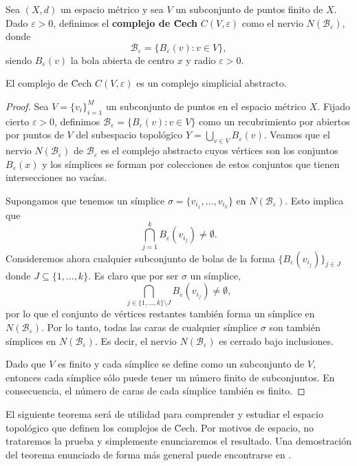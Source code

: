 \begin{definicion}
	Sea $(X,d)$ un espacio métrico y sea $V$ un subconjunto de puntos finito de $X$.
	Dado $\varepsilon > 0$, definimos el \textbf{complejo de \u Cech}
	$C(V, \varepsilon)$ como el nervio $N(\mathcal{B}_{\varepsilon})$, donde
	\[
	\mathcal{B}_{\varepsilon} = \{ B_{\varepsilon}(v) : v \in V \},
	\]
	siendo $B_{\varepsilon}(v)$ la bola abierta de centro $x$ y radio $\varepsilon
	> 0$.
\end{definicion}

\begin{proposicion}
	El complejo de \u Cech $C(V, \varepsilon)$ es un complejo simplicial abstracto.
\end{proposicion}
\begin{proof}
	Sea $V = \{v_{i}\}_{i=1}^{M}$ un subconjunto de puntos en el espacio métrico $X$.
	Fijado cierto $\varepsilon > 0$, definimos $\mathcal{B}_{\varepsilon} = \{B_{\varepsilon}
	(v) : v \in V \}$ como un recubrimiento por abiertos por puntos de $V$ del subespacio
	topológico $Y = \bigcup_{v \in V}B_{\varepsilon}(v)$. Veamos que el nervio
	$N(\mathcal{B}_{\varepsilon})$ de $\mathcal{B}_{\varepsilon}$ es el complejo
	abstracto cuyos vértices son los conjuntos $B_{\varepsilon}(x)$ y los
	símplices se forman por colecciones de estos conjuntos que tienen
	intersecciones no vacías.
	
	Supongamos que tenemos un símplice $\sigma = \{v_{i_1}, \ldots, v_{i_k}\}$ en
	$N(\mathcal{B}_{\varepsilon})$. Esto implica que
	\[
	\bigcap_{j=1}^{k} B_{\varepsilon}(v_{i_j}) \neq \emptyset.
	\]
	Consideremos ahora cualquier subconjunto de bolas de la forma $\{B_{\varepsilon}
	(v_{i_j})\}_{j \in J}$ donde $J \subseteq \{1, \ldots, k\}$. Es claro que por
	ser $\sigma$ un símplice,
	\[
	\bigcap_{j \in \{1, \ldots, k\} \setminus J}B_{\varepsilon}(v_{i_j}) \neq \emptyset
	,
	\]
	por lo que el conjunto de vértices restantes también forma un símplice en $N(\mathcal{B}
	_{\varepsilon})$. Por lo tanto, todas las caras de cualquier símplice $\sigma$
	son también símplices en $N(\mathcal{B}_{\varepsilon})$. Es decir, el nervio $N
	(\mathcal{B}_{\varepsilon})$ es cerrado bajo inclusiones.
	
	Dado que $V$ es finito y cada símplice se define como un subconjunto de $V$,
	entonces cada símplice sólo puede tener un número finito de subconjuntos. En consecuencia,
	el número de caras de cada símplice también es finito.
\end{proof}

El siguiente teorema será de utilidad para comprender y estudiar el espacio topológico
que definen los complejos de \u Cech. Por motivos de espacio, no trataremos la prueba
y simplemente enunciaremos el resultado. Una demostración del teorema enunciado
de forma más general puede encontrarse en \cite{hatcher2002algebraic}.

